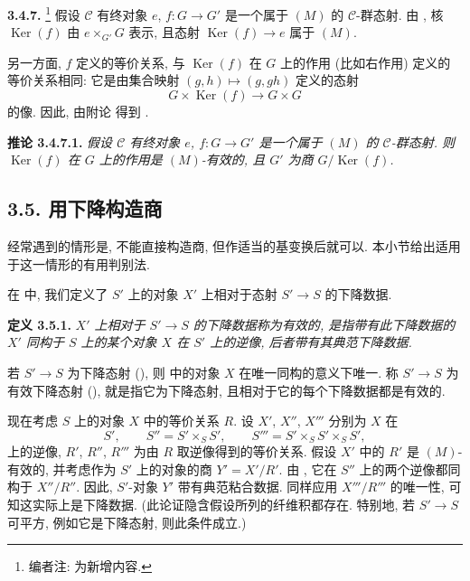 \medskip
\noindent{}\textbf{3.4.7.}
\footnote{编者注:  为新增内容.}
假设 \(\mathscr C\) 有终对象 \(e\), \(f:G\to G'\)
是一个属于 \((M)\) 的 \(\mathscr C\)-群态射.
由 ,
核 \(\operatorname{Ker}(f)\) 由 \(e\times_{G'}G\) 表示,
且态射 \(\operatorname{Ker}(f)\to e\) 属于 \((M)\).

另一方面, \(f\) 定义的等价关系, 与 \(\operatorname{Ker}(f)\)
在 \(G\) 上的作用 (比如右作用) 定义的等价关系相同:
它是由集合映射 \((g,h)\mapsto(g,gh)\) 定义的态射
\[
  G\times\operatorname{Ker}(f)\longrightarrow G\times G
\]
的像. 因此, 由附论 
得到 .

\medskip
\noindent{}\textbf{推论 3.4.7.1.}
\textit{假设 \(\mathscr C\) 有终对象 \(e\), \(f:G\to G'\)
是一个属于 \((M)\) 的 \(\mathscr C\)-群态射.
则 \(\operatorname{Ker}(f)\) 在 \(G\) 上的作用是
\((M)\)-有效的, 且 \(G'\) 为商 \(G/\operatorname{Ker}(f)\).}

\subsection*{3.5. 用下降构造商}

经常遇到的情形是, 不能直接构造商, 但作适当的基变换后就可以.
本小节给出适用于这一情形的有用判别法.

在  中,
我们定义了 \(S'\) 上的对象 \(X'\) 上相对于态射 \(S'\to S\) 的下降数据.

\medskip
\noindent{}\textbf{定义 3.5.1.}
\textit{\(X'\) 上相对于 \(S'\to S\) 的下降数据称为\emph{有效的},
是指带有此下降数据的 \(X'\) 同构于 \(S\) 上的某个对象 \(X\)
在 \(S'\) 上的逆像, 后者带有其典范下降数据.}

若 \(S'\to S\) 为下降态射 (),
则  中的对象 \(X\)
在唯一同构的意义下唯一.
称 \(S'\to S\) 为有效下降态射 (),
就是指它为下降态射, 且相对于它的每个下降数据都是有效的.

现在考虑 \(S\) 上的对象 \(X\) 中的等价关系 \(R\).
设 \(X'\), \(X''\), \(X'''\) 分别为 \(X\) 在
\[
  S',\qquad S''=S'\times_SS',\qquad
  S'''=S'\times_SS'\times_SS',
\]
上的逆像, \(R'\), \(R''\), \(R'''\) 为由 \(R\) 取逆像得到的等价关系.
假设 \(X'\) 中的 \(R'\) 是 \((M)\)-有效的,
并考虑作为 \(S'\) 上的对象的商 \(Y'=X'/R'\).
由 ,
它在 \(S''\) 上的两个逆像都同构于 \(X''/R''\).
因此, \(S'\)-对象 \(Y'\) 带有典范粘合数据.
同样应用 \(X'''/R'''\) 的唯一性, 可知这实际上是下降数据.
(此论证隐含假设所列的纤维积都存在. 特别地,
若 \(S'\to S\) 可平方, 例如它是下降态射, 则此条件成立.)

